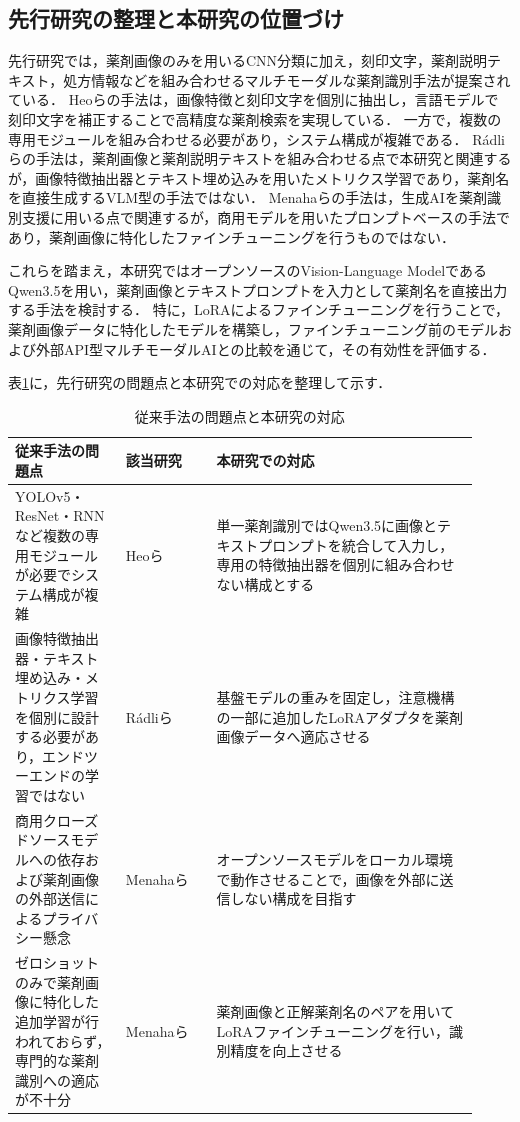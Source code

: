\documentclass[dvipdfmx]{jsarticle}
\begin{document}
\subsection{先行研究の整理と本研究の位置づけ}

先行研究では，薬剤画像のみを用いるCNN分類に加え，刻印文字，薬剤説明テキスト，処方情報などを組み合わせるマルチモーダルな薬剤識別手法が提案されている．
Heoらの手法は，画像特徴と刻印文字を個別に抽出し，言語モデルで刻印文字を補正することで高精度な薬剤検索を実現している．
一方で，複数の専用モジュールを組み合わせる必要があり，システム構成が複雑である．
Rádliらの手法は，薬剤画像と薬剤説明テキストを組み合わせる点で本研究と関連するが，画像特徴抽出器とテキスト埋め込みを用いたメトリクス学習であり，薬剤名を直接生成するVLM型の手法ではない．
Menahaらの手法は，生成AIを薬剤識別支援に用いる点で関連するが，商用モデルを用いたプロンプトベースの手法であり，薬剤画像に特化したファインチューニングを行うものではない．

これらを踏まえ，本研究ではオープンソースのVision-Language ModelであるQwen3.5を用い，薬剤画像とテキストプロンプトを入力として薬剤名を直接出力する手法を検討する．
特に，LoRAによるファインチューニングを行うことで，薬剤画像データに特化したモデルを構築し，ファインチューニング前のモデルおよび外部API型マルチモーダルAIとの比較を通じて，その有効性を評価する．

表\ref{tab:related}に，先行研究の問題点と本研究での対応を整理して示す．

\begin{table}[h]
\centering
\caption{従来手法の問題点と本研究の対応}
\label{tab:related}
\small
\setlength{\tabcolsep}{4pt}
\begin{tabular}{p{0.22\linewidth}p{0.18\linewidth}p{0.52\linewidth}}
\hline
従来手法の問題点 & 該当研究 & 本研究での対応 \\
\hline
YOLOv5・ResNet・RNNなど複数の専用モジュールが必要でシステム構成が複雑 &
Heoら \cite{heo2023pill} &
単一薬剤識別ではQwen3.5に画像とテキストプロンプトを統合して入力し，専用の特徴抽出器を個別に組み合わせない構成とする \\
\hline
画像特徴抽出器・テキスト埋め込み・メトリクス学習を個別に設計する必要があり，エンドツーエンドの学習ではない &
Rádliら \cite{radli2024metric} &
基盤モデルの重みを固定し，注意機構の一部に追加したLoRAアダプタを薬剤画像データへ適応させる \\
\hline
商用クローズドソースモデルへの依存および薬剤画像の外部送信によるプライバシー懸念 &
Menahaら \cite{gemini2024pill} &
オープンソースモデルをローカル環境で動作させることで，画像を外部に送信しない構成を目指す \\
\hline
ゼロショットのみで薬剤画像に特化した追加学習が行われておらず，専門的な薬剤識別への適応が不十分 &
Menahaら \cite{gemini2024pill} &
薬剤画像と正解薬剤名のペアを用いてLoRAファインチューニングを行い，識別精度を向上させる \\
\hline
\end{tabular}
\end{table}
\end{document}
